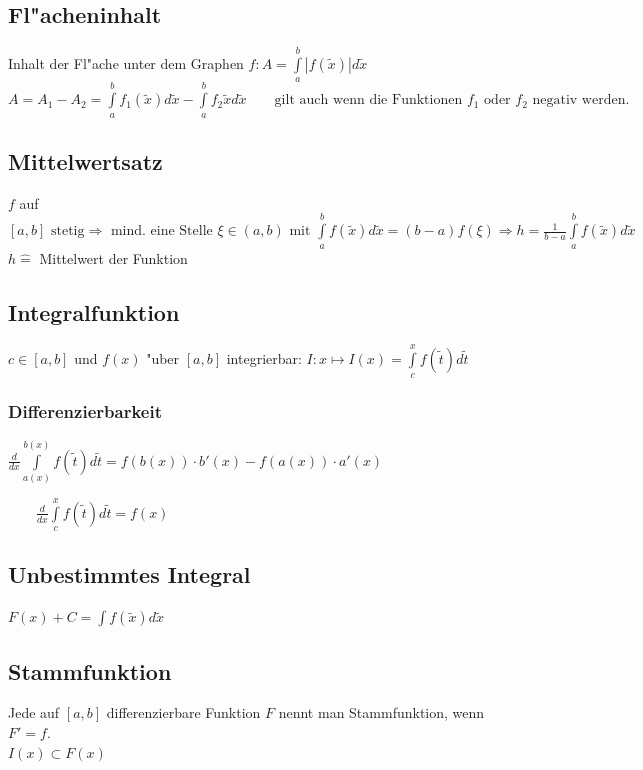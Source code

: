 \subsection{Fl"acheninhalt}
	Inhalt der Fl"ache unter dem Graphen $f: A = \int\limits_a^b |f(\widetilde{x})| d\widetilde{x}$ \\
	$A = A_1 - A_2 = \int\limits_a^b f_1(\widetilde{x}) d\widetilde{x} - \int\limits_a^b f_2{\widetilde{x}} d\widetilde{x} \qquad \text{gilt auch wenn die Funktionen }f_1 \text{ oder }f_2 \text{ negativ werden.}$

\subsection{Mittelwertsatz}
	$f$ auf $[a,b] \mbox{ stetig} \Rightarrow \mbox{ mind. eine Stelle } \xi \in (a,b)\mbox{ mit } \int\limits_a^b{f(\widetilde{x})}d\widetilde{x}=(b-a)f(\xi) 
	\Rightarrow h = \frac{1}{b-a} \int\limits_a^b{f(\widetilde{x})}d\widetilde{x}$ \\
	$h \hat{=}$ Mittelwert der Funktion

\subsection{Integralfunktion}
	$c \in [a,b]$ und $f(x)$ "uber $[a,b]$ integrierbar: $I: x \mapsto I(x) = \int\limits_c^x{f(\widetilde{t})}d\widetilde{t}$
	
\subsubsection{Differenzierbarkeit} 
	\begin{minipage}[t]{9.5cm}		
			$ \frac{d}{dx} \int\limits_{a(x)}^{b(x)} f(\widetilde{t}) d\widetilde{t} = f(b(x)) \cdot b'(x) - f(a(x)) \cdot a'(x) $
	\end{minipage}
	\begin{minipage}[t]{5cm} 	
			$ \qquad \frac{d}{dx} \int\limits_c^x f(\widetilde{t})d\widetilde{t} = f(x)$
	\end{minipage}
	
\subsection{Unbestimmtes Integral}
	$F(x) + C = \int{f(\widetilde{x})}d\widetilde{x}$

\subsection{Stammfunktion}
	Jede auf $[a,b]$ differenzierbare Funktion $F$ nennt man Stammfunktion, wenn $F'=f$.\\
	$I(x) \subset F(x)$

